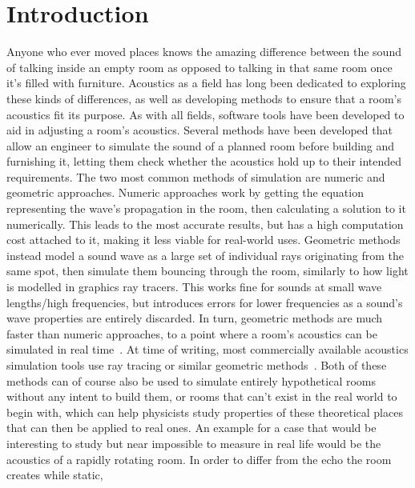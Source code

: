 \chapter{Introduction}

Anyone who ever moved places knows the amazing difference between the sound of talking inside an empty room
as opposed to talking in that same room once it's filled with furniture.
Acoustics as a field has long been dedicated to exploring these kinds of differences,
as well as developing methods to ensure that a room's acoustics fit its purpose.
\newline
As with all fields, software tools have been developed to aid in adjusting a room's acoustics.
Several methods have been developed that allow an engineer to simulate the sound of a planned room before building and furnishing it,
letting them check whether the acoustics hold up to their intended requirements.
\newline
The two most common methods of simulation are numeric and geometric approaches.
Numeric approaches work by getting the equation representing the wave's propagation in the room,
then calculating a solution to it numerically.
This leads to the most accurate results, but has a high computation cost attached to it,
making it less viable for real-world uses.
\newline
Geometric methods instead model a sound wave as a large set of individual rays originating from the same spot,
then simulate them bouncing through the room,
similarly to how light is modelled in graphics ray tracers.
This works fine for sounds at small wave lengths/high frequencies,
but introduces errors for lower frequencies as a sound's wave properties are entirely discarded.
In turn, geometric methods are much faster than numeric approaches,
to a point where a room's acoustics can be simulated in real time~\cite{Cha08}.
At time of writing, most commercially available acoustics simulation tools use ray tracing or similar geometric methods~\cite{Th17}.
\newline
Both of these methods can of course also be used to simulate entirely hypothetical rooms without any intent to build them,
or rooms that can't exist in the real world to begin with,
which can help physicists study properties of these theoretical places that can then be applied to real ones.
\newline
An example for a case that would be interesting to study but near impossible to measure in real life
would be the acoustics of a rapidly rotating room.
In order to differ from the echo the room creates while static,
